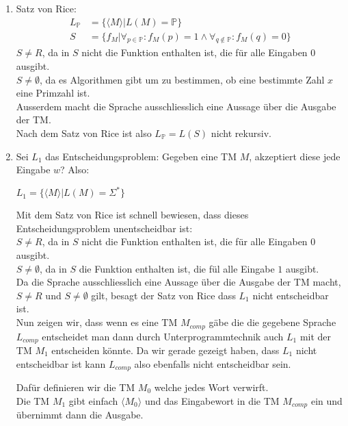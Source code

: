 \documentclass[a4paper,11pt]{scrartcl}
\begin{document}
	\begin{enumerate}[label=\alph*)]
	\item	Satz von Rice:
			\begin{align*}
			L_{\mathbb{P}} &= \{\langle M \rangle \vert L(M) = \mathbb{P}\} \\
			S &= \{f_M \vert \forall_{p\in\mathbb{P}}: f_M(p) = 1 \land \forall_{q\not\in\mathbb{P}}: f_M(q) = 0\}		
			\end{align*}
			$S \neq R$, da in $S$ nicht die Funktion enthalten ist, die für alle Eingaben $0$ ausgibt.\\
			$S \neq \emptyset$, da es Algorithmen gibt um zu bestimmen, ob eine bestimmte Zahl $x$ eine Primzahl ist.\\
			Ausserdem macht die Sprache ausschliesslich eine Aussage über die Ausgabe der TM.\\
			Nach dem Satz von Rice ist also $L_{\mathbb{P}} = L(S)$ nicht rekursiv.
\newpage
	\item	Sei $L_1$ das Entscheidungsproblem: Gegeben eine TM $M$, akzeptiert diese jede Eingabe $w$? Also:
			\begin{center}
			$L_1 = \{\langle M \rangle \vert L(M) = \Sigma^*\}$\\
			\end{center}
			Mit dem Satz von Rice ist schnell bewiesen, dass dieses Entscheidungsproblem unentscheidbar ist:\\
			$S \neq R$, da in $S$ nicht die Funktion enthalten ist, die für alle Eingaben $0$ ausgibt.\\
			$S \neq \emptyset$, da in $S$ die Funktion enthalten ist, die fül alle Eingabe $1$ ausgibt.\\
			Da die Sprache ausschliesslich eine Aussage über die Ausgabe der TM macht, $S \neq R$ und $S \neq \emptyset$ gilt, besagt der Satz von Rice dass $L_1$ nicht entscheidbar ist.\\

			Nun zeigen wir, dass wenn es eine TM $M_{comp}$ gäbe die die gegebene Sprache $L_{comp}$ entscheidet man dann durch Unterprogrammtechnik auch $L_1$ mit der TM $M_1$ entscheiden könnte.
			Da wir gerade gezeigt haben, dass $L_1$ nicht entscheidbar ist kann $L_{comp}$ also ebenfalls nicht entscheidbar sein.
			
			Dafür definieren wir die TM $M_0$ welche jedes Wort verwirft.\\
			Die TM $M_1$ gibt einfach $\langle M_0 \rangle$ und das Eingabewort in die TM $M_{comp}$ ein und übernimmt dann die Ausgabe.\\
			

\end{enumerate}
\end{document}
